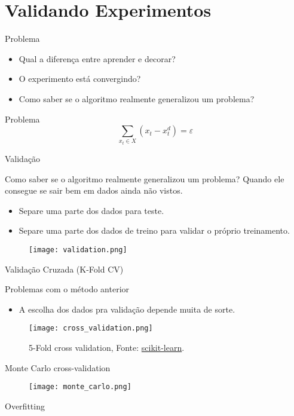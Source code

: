 \section{Validando Experimentos}

\begin{frame}{Problema}
  \begin{itemize}
    \item Qual a diferença entre aprender e decorar?
    \item O experimento está convergindo?
    \item Como saber se o algoritmo realmente generalizou um problema?
  \end{itemize}
\end{frame}

\begin{frame}{Problema}
  \[ \sum_{x_t \in X} (x_t - x_{t}^d) = \varepsilon \]
\end{frame}

\begin{frame}{Validação}
  \begin{block}{Como saber se o algoritmo realmente generalizou um problema?}
  Quando ele consegue se sair bem em dados ainda não vistos.
  \end{block}

  \pause

  \begin{itemize}
    \item Separe uma parte dos dados para teste.
    \item Separe uma parte dos dados de treino para validar o próprio treinamento.
  \end{itemize}

  \begin{figure}[t]
    \texttt{[image: validation.png]}
    \centering
  \end{figure}

\end{frame}

\begin{frame}{Validação Cruzada (K-Fold CV)}
  \begin{block}{Problemas com o método anterior}
    \begin{itemize}
      \item A escolha dos dados pra validação depende muita de sorte.
    \end{itemize}
  \end{block}

  \pause

  \begin{figure}[t]
    \texttt{[image: cross\_validation.png]}
    \caption{5-Fold cross validation, Fonte: \href{https://scikit-learn.org/stable/modules/cross_validation.html}{scikit-learn}.}
    \centering
  \end{figure}

\end{frame}

\begin{frame}{Monte Carlo cross-validation}
  \begin{figure}[t]
    \texttt{[image: monte\_carlo.png]}
    \centering
  \end{figure}
\end{frame}

\begin{frame}{Overfitting}

\end{frame}
